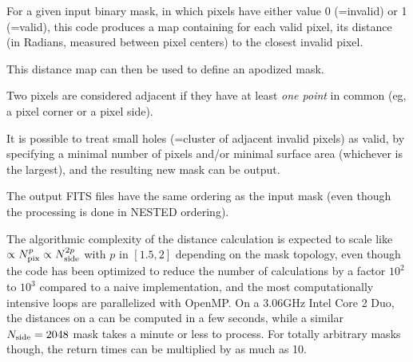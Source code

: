 \begin{codedescription}
{For a given input binary mask, in which pixels have either value 0 (=invalid) or 1 (=valid),
this code produces a map containing for each valid pixel,
its distance (in Radians, measured between pixel centers) to the closest invalid pixel.

This distance map can then be used to define an apodized mask.

Two pixels are considered adjacent if they have at least {\em one point} in common 
(eg, a pixel corner or a pixel side).

It is possible to treat small holes (=cluster of adjacent invalid pixels) as valid,
by specifying a minimal number of pixels and/or minimal surface area (whichever is the largest),
and the resulting new mask can be output.

The output FITS files have the same ordering as the input mask
(even though the processing is done in NESTED ordering).

{\footnotesize{The algorithmic complexity of the distance calculation is expected to scale like $\propto N_{\mathrm{pix}}^p
\propto N_{\mathrm{side}}^{2p}$ with $p$ in $[1.5,2]$ depending on the mask topology, even
though the code has been optimized to reduce the number of calculations by a
factor $10^2$ to $10^3$ compared to a naive implementation, and the most
computationally intensive loops are parallelized with OpenMP.
On a 3.06GHz Intel Core 2 Duo, the distances on a  can be computed in a few
seconds, while a similar $N_{\mathrm{side}}=2048$ mask takes a minute or less to process.
For totally arbitrary masks though, the return times can be multiplied by as
much as 10.}}

%
}
\end{codedescription}


